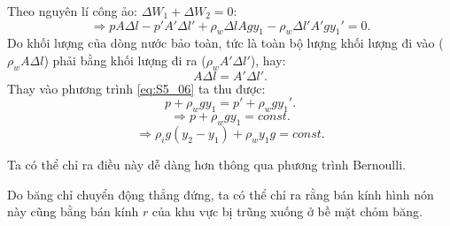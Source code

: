 \begin{enumerate}[label=(\alph*)]
\begin{enumerate}[label=(\roman*)]
    Theo nguyên lí công ảo: $\Delta W_1 + \Delta W_2=0$:
    \begin{equation}
    \label{eq:S5_06}
        \Longrightarrow p A\Delta l - p'A'\Delta l' + \rho_w\Delta lAgy_1-\rho_w\Delta l'A'gy_1'=0.
    \end{equation}
    Do khối lượng của dòng nước bảo toàn, tức là toàn bộ lượng khối lượng đi vào ($\rho_wA\Delta l$) phải bằng khối lượng đi ra ($\rho_wA'\Delta l'$), hay:
    \begin{equation}
        A\Delta l=A'\Delta l'.
    \end{equation}
    Thay vào phương trình \ref{eq:S5_06} ta thu được:
    \begin{equation}
        p + \rho_wgy_1=p'+\rho_wgy_1'.
    \end{equation}
    \begin{equation}
    \label{eq:S5_10}
        \Longrightarrow p + \rho_wgy_1=const.
    \end{equation}
    \begin{equation}
        \Longrightarrow \rho_ig( y_2- y_1) + \rho_w y_1 g= const.
    \end{equation}

    Ta có thể chỉ ra điều này dễ dàng hơn thông qua phương trình Bernoulli.
    
    Do băng chỉ chuyển động thẳng đứng, ta có thể chỉ ra rằng bán kính hình nón này cũng bằng bán kính $r$ của khu vực bị trũng xuống ở bề mặt chỏm băng.
    

\end{enumerate}
\end{enumerate}
